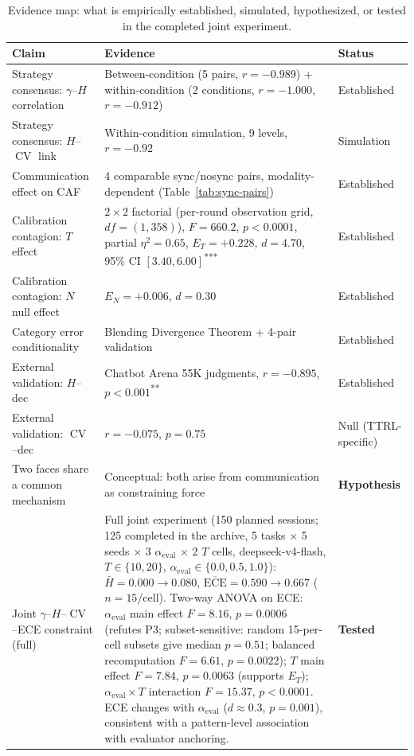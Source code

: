 \documentclass[11pt]{article}
\DeclareMathOperator{\CV}{CV}
\begin{document}
\begin{table}[t]
\centering
\caption{Evidence map: what is empirically established, simulated, hypothesized, or tested in the completed joint experiment.}
\label{tab:evidence}
\footnotesize
\begin{tabularx}{\textwidth}{@{}p{}X p{}@{}}
\toprule
\textbf{Claim} & \textbf{Evidence} & \textbf{Status} \\
\midrule
Strategy consensus: $\gamma$--$H$ correlation & Between-condition (5 pairs, $r{=}-0.989$) + within-condition (2 conditions, $r{=}-1.000$, $r{=}-0.912$)~\cite{impossible2026} & Established \\
Strategy consensus: $H$--$\CV$ link & Within-condition simulation, 9 levels, $r{=}-0.92$~\cite{impossible2026} & Simulation \\
Communication effect on CAF & 4 comparable sync/nosync pairs, modality-dependent (Table~\ref{tab:sync-pairs}) & Established \\
Calibration contagion: $T$ effect & $2{\times}2$ factorial (per-round observation grid, $df{=}(1,358)$), $F{=}660.2$, $p{<}0.0001$, partial $\eta^2{=}0.65$, $E_T{=}+0.228$, $d{=}4.70$, 95\% CI $[3.40, 6.00]$\textsuperscript{***}~\cite{calibration2026} & Established \\
Calibration contagion: $N$ null effect & $E_N{=}+0.006$, $d{=}0.30$~\cite{calibration2026} & Established \\
Category error conditionality & Blending Divergence Theorem + 4-pair validation~\cite{foerster2016learning,kapetanakis2014balanced} & Established \\
External validation: $H$--dec & Chatbot Arena 55K judgments, $r{=}-0.895$, $p{<}0.001$\textsuperscript{**}~\cite{zheng2023chatbot,chiang2024chatbot} & Established \\
External validation: $\CV$--dec & $r{=}-0.075$, $p{=}0.75$~\cite{zheng2023chatbot,chiang2024chatbot} & Null (TTRL-specific) \\
\midrule
Two faces share a common mechanism & Conceptual: both arise from communication as constraining force & \textbf{Hypothesis} \\
Joint $\gamma$--$H$--$\CV$--ECE constraint (full) & Full joint experiment (150 planned sessions; 125 completed in the archive, 5 tasks $\times$ 5 seeds $\times$ 3 $\alpha_{\text{eval}}$ $\times$ 2 $T$ cells, deepseek-v4-flash, $T \in \{10,20\}$, $\alpha_{\text{eval}} \in \{0.0,0.5,1.0\}$): $\bar{H} = 0.000 \to 0.080$, $\overline{\text{ECE}} = 0.590 \to 0.667$ ($n = 15$/cell). Two-way ANOVA on ECE: $\alpha_{\text{eval}}$ main effect $F = 8.16$, $p = 0.0006$ (refutes P3; subset-sensitive: random 15-per-cell subsets give median $p=0.51$; balanced recomputation $F=6.61$, $p=0.0022$); $T$ main effect $F = 7.84$, $p = 0.0063$ (supports $E_T$); $\alpha_{\text{eval}} \times T$ interaction $F = 15.37$, $p < 0.0001$. ECE changes with $\alpha_{\text{eval}}$ ($d \approx 0.3$, $p = 0.001$), consistent with a pattern-level association with evaluator anchoring. & \textbf{Tested} \\ 

\end{tabularx}
\end{table}
\end{document}
